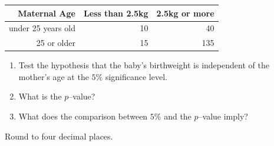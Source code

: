 \documentclass{article}
\begin{document}
\begin{table}[h]
\centering
\begin{tabular}{rrr}
  \hline
Maternal Age & Less than 2.5kg & 2.5kg or more\\
\hline
under 25 years old & 10 & 40 \\
25 or older & 15 & 135\\
\hline
\end{tabular}
\end{table}
\begin{enumerate}
\item[(a)] Test the hypothesis that the baby's birthweight is independent of the mother's age at the  $5\%$ significance level. 
\item[(b)] What is the $p$--value? 
\item[(c)] What does the comparison between $5\%$ and the $p$--value imply? 
\end{enumerate}
Round to four decimal places. 
\end{document}
